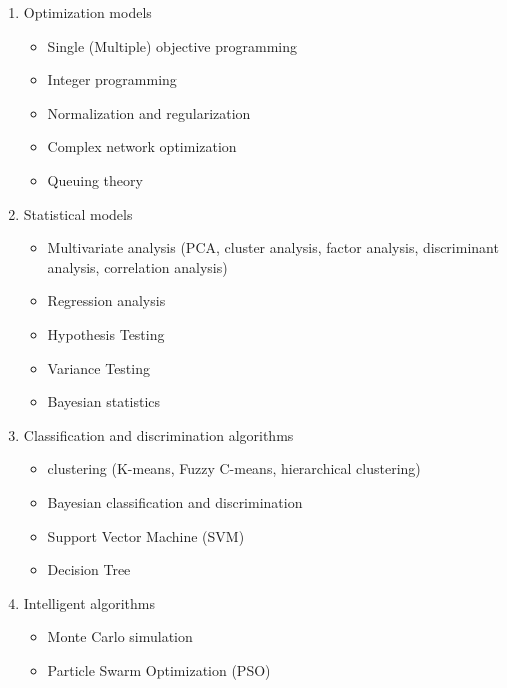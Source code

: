 \documentclass[12pt]{article}  %
\begin{document}
\begin{enumerate}[(1)]
\begin{itemize}
 \end{itemize}
 \item Optimization models
 \begin{itemize}
     \setlength{\parsep}{0ex} %
     \setlength{\topsep}{2ex} %
     \setlength{\itemsep}{1ex} %
     \item Single  (Multiple) objective programming
     \item Integer programming
     \item Normalization and regularization
     \item Complex network optimization
     \item Queuing theory
 \end{itemize}
 \item Statistical models
 \begin{itemize}
     \setlength{\parsep}{0ex} %
     \setlength{\topsep}{2ex} %
     \setlength{\itemsep}{1ex} %
     \item Multivariate analysis (PCA, cluster analysis, factor analysis, discriminant analysis, correlation analysis)
     \item Regression analysis
     \item Hypothesis Testing
     \item Variance Testing
     \item Bayesian statistics
 \end{itemize}
 \item Classification and discrimination algorithms
 \begin{itemize}
     \setlength{\parsep}{0ex} %
     \setlength{\topsep}{2ex} %
     \setlength{\itemsep}{1ex} %
     \item clustering (K-means, Fuzzy C-means, hierarchical clustering)
     \item Bayesian classification and discrimination
     \item Support Vector Machine (SVM)
     \item Decision Tree
 \end{itemize}
 \item Intelligent algorithms
 \begin{itemize}
     \setlength{\parsep}{0ex} %
     \setlength{\topsep}{2ex} %
     \setlength{\itemsep}{1ex} %
     \item Monte Carlo simulation
     \item Particle Swarm Optimization (PSO)

\end{itemize}
\end{enumerate}
\end{document}
